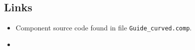 \subsection*{Links}
\begin{itemize}
  \item Component source code found in file \texttt{Guide\_curved.comp}.
  \item {}
\end{itemize}
